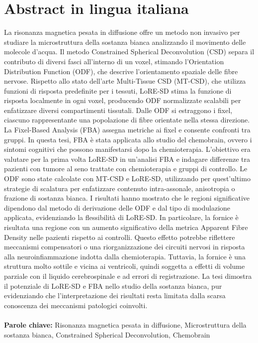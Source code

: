 \documentclass{Configuration_Files/PoliMi3i_thesis}
\begin{document}
\chapter*{Abstract in lingua italiana}
La risonanza magnetica pesata in diffusione offre un metodo non invasivo per studiare la microstruttura della sostanza bianca analizzando il movimento delle molecole d’acqua. Il metodo Constrained Spherical Deconvolution (CSD) separa il contributo di diversi fasci all’interno di un voxel, stimando l'Orientation Distribution Function (ODF), che descrive l’orientamento spaziale delle fibre nervose. Rispetto allo stato dell'arte Multi-Tissue CSD (MT-CSD), che utilizza funzioni di risposta predefinite per i tessuti, LoRE-SD stima la funzione di risposta localmente in ogni voxel, producendo ODF normalizzate scalabili per enfatizzare diversi compartimenti tissutali.
Dalle ODF si estraggono i fixel, ciascuno rappresentante una popolazione di fibre orientate nella stessa direzione. La Fixel-Based Analysis (FBA) assegna metriche ai fixel e consente confronti tra gruppi. 
In questa tesi, FBA è stata applicata allo studio del chemobrain, ovvero i sintomi cognitivi che possono manifestarsi dopo la chemioterapia. L’obiettivo era valutare per la prima volta LoRE-SD in un’analisi FBA e indagare differenze tra pazienti con tumore al seno trattate con chemioterapia e gruppi di controllo. Le ODF sono state calcolate con MT-CSD e LoRE-SD, utilizzando per quest’ultimo strategie di scalatura per enfatizzare contenuto intra-assonale, anisotropia o frazione di sostanza bianca. I risultati hanno mostrato che le regioni significative dipendono dal metodo di derivazione delle ODF e dal tipo di modulazione applicata, evidenziando la flessibilità di LoRE-SD.
In particolare, la fornice è risultata una regione con un aumento significativo della metrica Apparent Fibre Density nelle pazienti rispetto ai controlli. Questo effetto potrebbe riflettere meccanismi compensatori o una riorganizzazione dei circuiti nervosi in risposta alla neuroinfiammazione indotta dalla chemioterapia. Tuttavia, la fornice è una struttura molto sottile e vicina ai ventricoli, quindi soggetta a effetti di volume parziale con il liquido cerebrospinale e ad errori di registrazione.
La tesi dimostra il potenziale di LoRE-SD e FBA nello studio della sostanza bianca, pur evidenziando che l’interpretazione dei risultati resta limitata dalla scarsa conoscenza dei meccanismi patologici coinvolti.
\\
\\
\textbf{Parole chiave:} Risonanza magnetica pesata in diffusione, Microstruttura della sostanza bianca, Constrained Spherical Deconvolution, Chemobrain %
\end{document}
